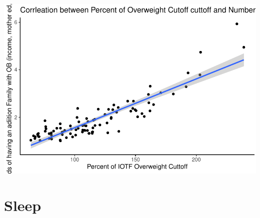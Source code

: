 \documentclass[
]{article}
\begin{document}
\FloatBarrier

\includegraphics{UAE_MedPaper_Figs/fig-IOTF_pOWcutoff_nFamOB_adjOdds_plot-1.pdf}

\FloatBarrier
\clearpage

\hypertarget{sleep}{%
\section{Sleep}\label{sleep}}
\end{document}
